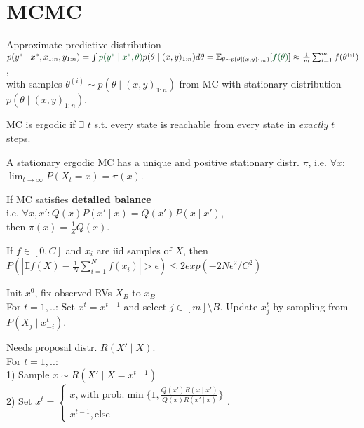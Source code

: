 \section{MCMC}
Approximate predictive distribution \\
$p(y^* \mid  x^*, x_{1:n}, y_{1:n}) \\
=\int \textcolor{darkgreen}{p(y^* \mid  x^*, \theta)} 
p(\theta \mid  (x,y)_{1:n})d\theta \\
=\mathbb{E}_{\theta \sim p(\theta \mid  (x,y)_{1:n})}[\textcolor{darkgreen}{f(\theta)}]
\approx \frac{1}{m} \sum_{i=1}^{m} f(\theta^{(i)})$,\\ 
with samples $\theta^{(i)} \sim p(\theta \mid  (x,y)_{1:n})$ 
from MC with stationary distribution $p(\theta\mid  (x,y)_{1:n})$.

MC is {ergodic} if $\exists$ $t$ s.t. every state is reachable from every state
in \textit{exactly} $t$ steps.


A stationary ergodic MC has a unique and positive stationary distr. $\pi$,
i.e. {$\forall x$: $\lim_{t \rightarrow \infty} P(X_t = x) = \pi(x)$}.

If MC satisfies \textbf{detailed balance}\\ i.e. $\forall x,x':
Q(x)P(x' \mid  x) = Q(x')P(x \mid  x')$,\\
then $\pi(x) = \frac{1}{Z} Q(x)$.


 If $f \in [0,C]$ and $x_i$ are iid samples of $X$, then\\
\mbox{\fontsize{9.5}{6}\selectfont $P(|\mathbb{E}f(X) - \frac{1}{N}\sum_{i=1}^{N} f(x_i)| > \epsilon) \leq 2 exp(-2N\epsilon^2/C^2)$}


Init ${x^{0}}$, fix observed RVs $X_B$ to ${x_B}$\\
For $t=1,..$: Set ${x}^{t} = {x}^{t-1}$ and 
{select} ${j \in [m] \setminus B}.$ 
Update $x_j^{t}$ by sampling from 
$P(X_j \mid  {x}^{t}_{-i})$.


Needs proposal distr. $R(X' \mid  X)$.\\
For $t=1,..$:\\ 
1) Sample $x \sim R(X' \mid  X=x^{t-1})$\\
2) Set $x^{t}=\begin{cases*}x, \text{with prob.}\min \{ 1, \frac{Q(x')R(x \mid  x')}{Q(x) R(x' \mid  x)}\}
\\ x^{t-1}, \text{else}\end{cases*}$.

